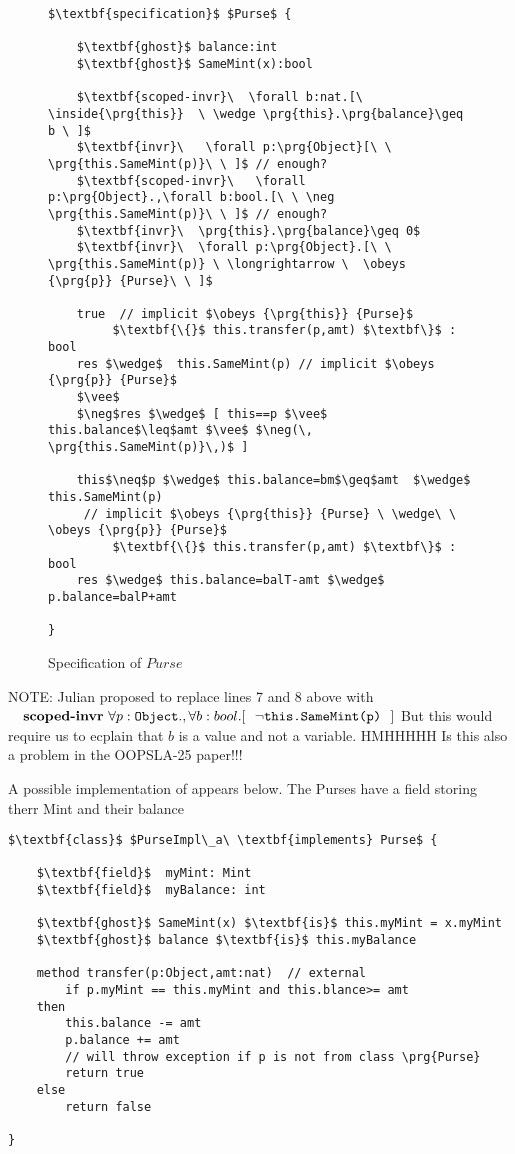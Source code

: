 \begin{figure*}[t]
\begin{lstlisting}[mathescape=true, language=Chainmail, frame=lines]
$\textbf{specification}$ $Purse$ {
    
    $\textbf{ghost}$ balance:int
    $\textbf{ghost}$ SameMint(x):bool  
         
    $\textbf{scoped-invr}\  \forall b:nat.[\ \inside{\prg{this}}  \ \wedge \prg{this}.\prg{balance}\geq b \ ]$
    $\textbf{invr}\   \forall p:\prg{Object}[\ \ \prg{this.SameMint(p)}\ \ ]$ // enough?
    $\textbf{scoped-invr}\   \forall p:\prg{Object}.,\forall b:bool.[\ \ \neg \prg{this.SameMint(p)}\ \ ]$ // enough?
    $\textbf{invr}\  \prg{this}.\prg{balance}\geq 0$       
    $\textbf{invr}\  \forall p:\prg{Object}.[\ \ \prg{this.SameMint(p)} \ \longrightarrow \  \obeys {\prg{p}} {Purse}\ \ ]$
     
    true  // implicit $\obeys {\prg{this}} {Purse}$
         $\textbf{\{}$ this.transfer(p,amt) $\textbf\}$ : bool
    res $\wedge$  this.SameMint(p) // implicit $\obeys {\prg{p}} {Purse}$
    $\vee$
    $\neg$res $\wedge$ [ this==p $\vee$ this.balance$\leq$amt $\vee$ $\neg(\, \prg{this.SameMint(p)}\,)$ ]

    this$\neq$p $\wedge$ this.balance=bm$\geq$amt  $\wedge$   this.SameMint(p)  
     // implicit $\obeys {\prg{this}} {Purse} \ \wedge\ \    \obeys {\prg{p}} {Purse}$
         $\textbf{\{}$ this.transfer(p,amt) $\textbf\}$ : bool
    res $\wedge$ this.balance=balT-amt $\wedge$ p.balance=balP+amt 

}

\end{lstlisting}
\caption{Specification of  $Purse$ }
\label{fig:PurseSpec}
 \end{figure*}
 
 NOTE: Julian proposed to replace lines 7 and 8 above with   \\
 $\ \ \  $ $\textbf{scoped-invr}\   \forall p:\prg{Object}.,\forall b:bool.[\ \ \neg \prg{this.SameMint(p)}\ \ ]$ 
But this would require us to ecplain that $b$ is a value and not a variable. HMHHHHH Is this also a problem in the OOPSLA-25 paper!!!

A possible implementation of  appears below. The Purses have a field storing therr Mint and their balance

\begin{lstlisting}[mathescape=true, language=Chainmail, frame=lines]
$\textbf{class}$ $PurseImpl\_a\ \textbf{implements} Purse$ {
    
    $\textbf{field}$  myMint: Mint
    $\textbf{field}$  myBalance: int
     
    $\textbf{ghost}$ SameMint(x) $\textbf{is}$ this.myMint = x.myMint
    $\textbf{ghost}$ balance $\textbf{is}$ this.myBalance
    
    method transfer(p:Object,amt:nat)  // external
    	if p.myMint == this.myMint and this.blance>= amt 
	then
		this.balance -= amt
		p.balance += amt
		// will throw exception if p is not from class \prg{Purse}
		return true
	else
		return false	
  
}
\end{lstlisting}

